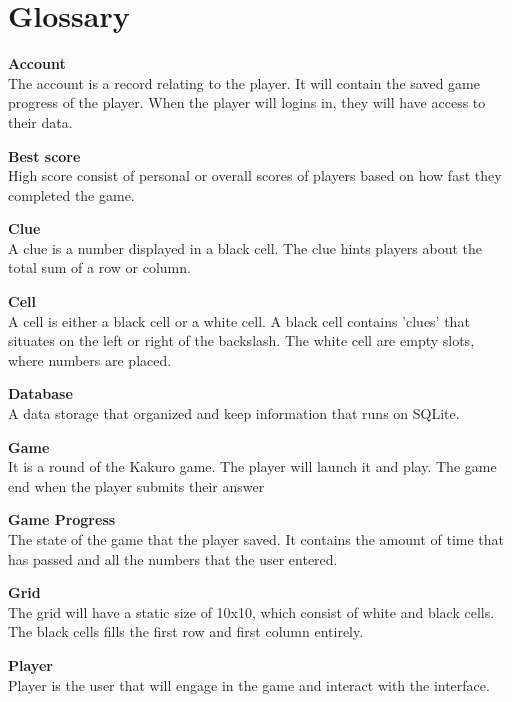 \documentclass[12pt]{article}
\begin{document}
\newpage

\section{Glossary}

\textbf{Account}\\
The account is a record relating to the player. It will contain the saved game progress of the player. When the player will logins in, they will have access to their data.
\vspace{5mm}

\textbf{Best score}\\ 
High score consist of personal or overall scores of players based on how fast they completed the game.
\vspace{5mm}

\textbf{Clue} \\
A clue is a number displayed in a black cell. The clue hints players about the total sum of a row or column. 
\vspace{5mm}

\textbf{Cell} \\
A cell is either a black cell or a white cell. A black cell contains 'clues' that situates on the left or right of the backslash. The white cell are empty slots, where numbers are placed.
\vspace{5mm}

\textbf{Database}\\
A data storage that organized and keep information that runs on SQLite.
\vspace{5mm}

\textbf{Game}\\
It is a round of the Kakuro game. The player will launch it and play. The game end when the player submits  their answer
\vspace{5mm}

\textbf{Game Progress}\\
The state of the game that the player saved. It contains the amount of time that has passed and all the numbers that the user entered.
\vspace{5mm}

\textbf{Grid}\\
The grid will have a static size of 10x10, which consist of white and black cells. The black cells fills the first row and first column entirely.
\vspace{5mm}

\textbf{Player}\\
Player is the user that will engage in the game and interact with the interface.
\vspace{5mm}
\end{document}
